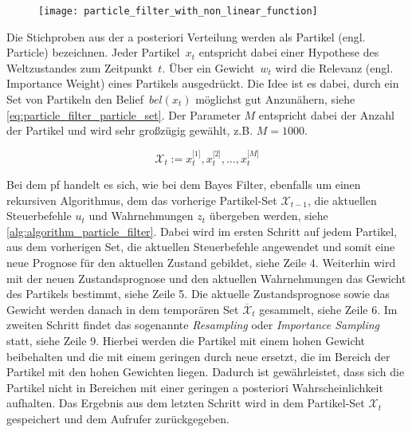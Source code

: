 \begin{figure}
	\centering
	\texttt{[image: particle\_filter\_with\_non\_linear\_function]}
	\label{fig:particle_filter_with_non_linear_function}
\end{figure}

Die Stichproben aus der a posteriori Verteilung werden als Partikel (engl. Particle) bezeichnen. Jeder Partikel~$x_t$ entspricht dabei einer Hypothese des Weltzustandes zum Zeitpunkt~$t$. Über ein Gewicht~$w_t$ wird die Relevanz (engl. Importance Weight) eines Partikels ausgedrückt. Die Idee ist es dabei, durch ein Set von Partikeln den Belief~$bel(x_t)$ möglichst gut Anzunähern, siehe \autoref{eq:particle_filter_particle_set}. Der Parameter $M$ entspricht dabei der Anzahl der Partikel und wird sehr großzügig gewählt, z.B. $M=1000$.

\begin{equation}
\mathcal{X}_t := x^{\lbrack 1 \rbrack}_t, x^{\lbrack 2 \rbrack}_t, \ldots, x^{\lbrack M \rbrack}_t \label{eq:particle_filter_particle_set}
\end{equation}

Bei dem \Gls{pf} handelt es sich, wie bei dem Bayes Filter, ebenfalls um einen rekursiven Algorithmus, dem das vorherige Partikel-Set $\mathcal{X}_{t-1}$, die aktuellen Steuerbefehle $u_t$ und Wahrnehmungen $z_t$ übergeben werden, siehe \autoref{alg:algorithm_particle_filter}. Dabei wird im ersten Schritt auf jedem Partikel, aus dem vorherigen Set, die aktuellen Steuerbefehle angewendet und somit eine neue Prognose für den aktuellen Zustand gebildet, siehe Zeile 4. Weiterhin wird mit der neuen Zustandsprognose und den aktuellen Wahrnehmungen das Gewicht des Partikels bestimmt, siehe Zeile 5. Die aktuelle Zustandsprognose sowie das Gewicht werden danach in dem temporären Set $\overline{\mathcal{X}}_t$ gesammelt, siehe Zeile 6. Im zweiten Schritt findet das sogenannte \textit{Resampling} oder \textit{Importance Sampling} statt, siehe Zeile 9. Hierbei werden die Partikel mit einem hohen Gewicht beibehalten und die mit einem geringen durch neue ersetzt, die im Bereich der Partikel mit den hohen Gewichten liegen. Dadurch ist gewährleistet, dass sich die Partikel nicht in Bereichen mit einer geringen a posteriori Wahrscheinlichkeit aufhalten. Das Ergebnis aus dem letzten Schritt wird in dem Partikel-Set $\mathcal{X}_t$ gespeichert und dem Aufrufer zurückgegeben.

